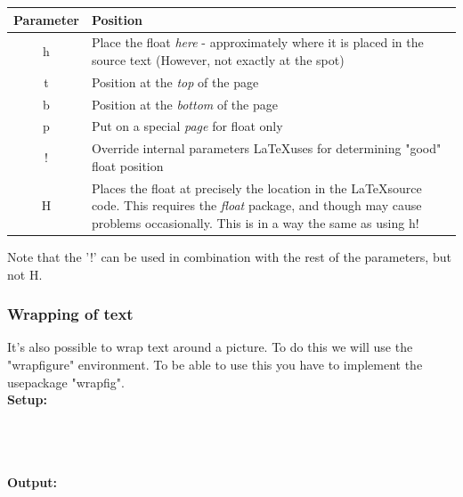 \begin{table}[h]
    \centering
    \begin{tabular}{|c|p{5in}|} \hline
        \rowcolor{gray!30}
        Parameter & Position \\ \hline
        h & Place the float \textit{here} - approximately where it is placed in the source text (However, not exactly at the spot) \\ \hline
        t & Position at the \textit{top} of the page \\ \hline
        b & Position at the \textit{bottom} of the page \\ \hline
        p & Put on a special \textit{page} for float only \\ \hline
        ! & Override internal parameters \LaTeX uses for determining "good" float position \\ \hline
        H & Places the float at precisely the location in the \LaTeX source code. This requires the \textit{float} package,
        and though may cause problems occasionally. This is in a way the same as using h! \\ \hline
    \end{tabular}
\end{table} %

Note that the '!' can be used in combination with the rest of the parameters, but not H.

\subsubsection{Wrapping of text} \label{secc:image_wrapping}
It's also possible to wrap text around a picture. To do this we will use the "wrapfigure" environment. 
To be able to use this you have to implement the usepackage "wrapfig". \\



\vspace{0.75em}
{\large\textbf{Setup:}} \\
 \\
     \\
 \\


\vspace{1.25em}

{\large\textbf{Output:}}


